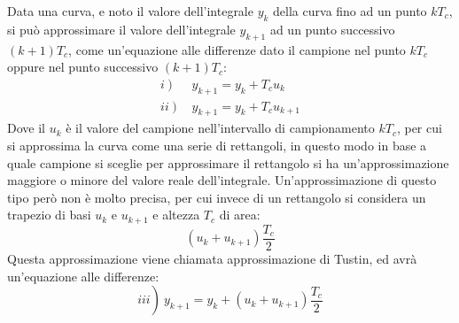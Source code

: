 \documentclass{article}
\numberwithin{equation}{subsection}
\begin{document}
Data una curva, e noto il valore dell'integrale $y_k$ della curva fino ad un punto $kT_c$, si può approssimare il valore dell'integrale $y_{k+1}$ ad un punto successivo 
$(k+1)T_c$, come un'equazione alle differenze dato il campione nel punto $kT_c$ oppure nel punto successivo $(k+1)T_c$:
\begin{align*}
    i\left.\right)\,&y_{k+1}=y_k+T_cu_k\\
    ii\left.\right)\,&y_{k+1}=y_k+T_cu_{k+1}
\end{align*}
Dove il $u_k$ è il valore del campione nell'intervallo di campionamento $kT_c$, per cui si approssima la curva come una serie di rettangoli, in questo modo in base 
a quale campione si sceglie per approssimare il rettangolo si ha un'approssimazione maggiore o minore del valore reale dell'integrale. Un'approssimazione di questo tipo 
però non è molto precisa, per cui invece di un rettangolo si considera un trapezio di basi $u_k$ e $u_{k+1}$ e altezza $T_c$ di area:
\begin{equation*}
    (u_k+u_{k+1})\displaystyle\frac{T_c}{2}
\end{equation*}
Questa approssimazione viene chiamata approssimazione di Tustin, ed avrà un'equazione alle differenze:
\begin{equation*}
    iii\left.\right)\:y_{k+1}=y_k+(u_k+u_{k+1})\displaystyle\frac{T_c}{2}
\end{equation*}
\begin{figure}[H]%
    \centering
    \qquad
    \qquad
\end{figure}
\end{document}
